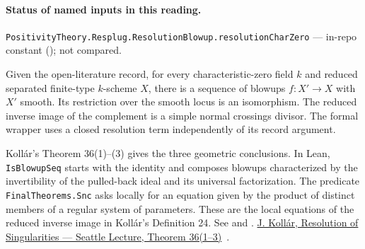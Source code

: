 

\paragraph{Status of named inputs in this reading.}
\noindent\nolinkurl{PositivityTheory.Resplug.ResolutionBlowup.resolutionCharZero} --- in-repo constant (); not compared.\par

\begin{formalstatement}\label{sub:T19}

Given the open-literature record, for every characteristic-zero field $k$
and reduced separated finite-type $k$-scheme $X$, there is a sequence of
blowups $f:X'\to X$ with $X'$ smooth. Its restriction over the smooth
locus is an isomorphism. The reduced inverse image of the complement
is a simple normal crossings divisor. The formal wrapper uses a closed
resolution term independently of its record argument.

\end{formalstatement}

\noindent Kollár's Theorem 36(1)--(3) gives the three geometric conclusions. In Lean, \nolinkurl{IsBlowupSeq} starts with the identity and composes blowups characterized by the invertibility of the pulled-back ideal and its universal factorization. The predicate \nolinkurl{FinalTheorems.Snc} asks locally for an equation given by the product of distinct members of a regular system of parameters. These are the local equations of the reduced inverse image in Kollár's Definition 24. See  and . \href{https://arxiv.org/pdf/math/0508332}{J. Kollár, Resolution of Singularities — Seattle Lecture, Theorem 36(1–3)}~\cite{r21-kollar}.
